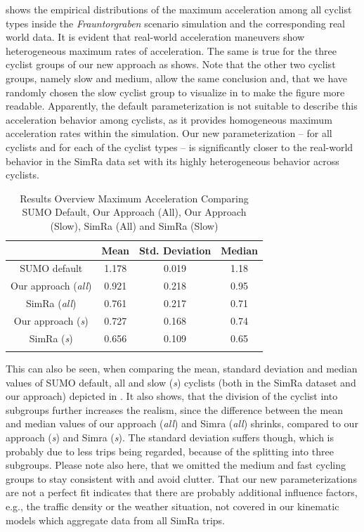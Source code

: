 shows the empirical distributions of the maximum acceleration among all cyclist types inside the \textit{Frauntorgraben} scenario simulation and the corresponding real world data.
It is evident that real-world acceleration maneuvers show heterogeneous maximum rates of acceleration.
The same is true for the three cyclist groups of our new approach as  shows.
Note that the other two cyclist groups, namely slow and medium, allow the same conclusion and, that we have randomly chosen the slow cyclist group to visualize in  to make the figure more readable.
Apparently, the default parameterization is not suitable to describe this acceleration behavior among cyclists, as it provides homogeneous maximum acceleration rates within the simulation.
Our new parameterization -- for all cyclists and for each of the cyclist types -- is significantly closer to the real-world behavior in the SimRa data set with its highly heterogeneous behavior across cyclists.
\begin{table}
\centering
\caption{Results Overview Maximum Acceleration Comparing SUMO Default, Our Approach (All), Our Approach (Slow), SimRa (All) and SimRa (Slow)}%
\label{tab:results_overview_acc}
\begin{tabular}{cccc}
\toprule
& Mean & Std. Deviation & Median\\
\midrule
\midrule
SUMO default & \num{1.178} & \num{0.019} & \num{1.18} \\
\midrule
Our approach (\textit{all}) & \num{0.921} & \num{0.218} & \num{0.95} \\
SimRa (\textit{all}) & \num{0.761} & \num{0.217} & \num{0.71} \\
\midrule
Our approach (\textit{s}) & \num{0.727} & \num{0.168} & \num{0.74} \\
SimRa (\textit{s}) & \num{0.656} & \num{0.109} & \num{0.65} \\
\bottomrule&
\end{tabular}
\end{table}
This can also be seen, when comparing the mean, standard deviation and median values of SUMO default, all and slow (\textit{s}) cyclists (both in the SimRa dataset and our approach) depicted in .
It also shows, that the division of the cyclist into subgroups further increases the realism, since the difference between the mean and median values of our approach (\textit{all}) and Simra (\textit{all}) shrinks, compared to our approach (\textit{s}) and Simra (\textit{s}).
The standard deviation suffers though, which is probably due to less trips being regarded, because of the splitting into three subgroups.
Please note also here, that we omitted the medium and fast cycling groups to stay consistent with  and avoid clutter.
That our new parameterizations are not a perfect fit indicates that there are probably additional influence factors, e.g., the traffic density or the weather situation, not covered in our kinematic models which aggregate data from all SimRa trips.

